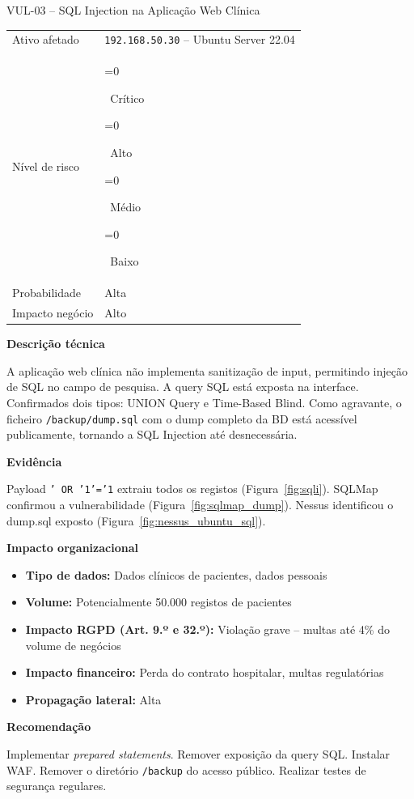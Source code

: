 \documentclass[12pt, a4paper]{report}
\newcommand{\risk}[1]{%
  \ifnum\pdfstrcmp{#1}{Critico}=0{\colorbox{Critical}{\color{white}\bfseries\footnotesize\strut~Crítico~}}\fi
  \ifnum\pdfstrcmp{#1}{Alto}=0{\colorbox{High}{\color{white}\bfseries\footnotesize\strut~Alto~}}\fi
  \ifnum\pdfstrcmp{#1}{Medio}=0{\colorbox{Medium}{\color{black}\bfseries\footnotesize\strut~Médio~}}\fi
  \ifnum\pdfstrcmp{#1}{Baixo}=0{\colorbox{Low}{\color{white}\bfseries\footnotesize\strut~Baixo~}}\fi}
\begin{document}
\vspace{0.8em}

\begin{finding}{VUL-03 -- SQL Injection na Aplicação Web Clínica}
\begin{tabular}{@{}ll@{}}
  \small\color{TextGray}Ativo afetado   & \texttt{192.168.50.30} -- Ubuntu Server 22.04 \\[3pt]
  \small\color{TextGray}Nível de risco  & \risk{Critico} \\[3pt]
  \small\color{TextGray}Probabilidade   & Alta \\[3pt]
  \small\color{TextGray}Impacto negócio & Alto \\
\end{tabular}

\vspace{8pt}\textbf{Descrição técnica}

A aplicação web clínica não implementa sanitização de input, permitindo injeção de SQL no
campo de pesquisa. A query SQL está exposta na interface. Confirmados dois tipos: UNION Query
e Time-Based Blind. Como agravante, o ficheiro \texttt{/backup/dump.sql} com o dump completo
da BD está acessível publicamente, tornando a SQL Injection até desnecessária.

\vspace{6pt}\textbf{Evidência}

Payload \texttt{' OR '1'='1} extraiu todos os registos (Figura~\ref{fig:sqli}). SQLMap
confirmou a vulnerabilidade (Figura~\ref{fig:sqlmap_dump}). Nessus identificou o dump.sql
exposto (Figura~\ref{fig:nessus_ubuntu_sql}).

\vspace{4pt}\textbf{Impacto organizacional}
\begin{itemize}[itemsep=1pt]
  \item \textbf{Tipo de dados:} Dados clínicos de pacientes, dados pessoais
  \item \textbf{Volume:} Potencialmente 50.000 registos de pacientes
  \item \textbf{Impacto RGPD (Art. 9.º e 32.º):} Violação grave -- multas até 4\% do volume de negócios
  \item \textbf{Impacto financeiro:} Perda do contrato hospitalar, multas regulatórias
  \item \textbf{Propagação lateral:} Alta
\end{itemize}

\vspace{4pt}\textbf{Recomendação}

Implementar \textit{prepared statements}. Remover exposição da query SQL. Instalar WAF.
Remover o diretório \texttt{/backup} do acesso público. Realizar testes de segurança regulares.
\end{finding}
\end{document}
